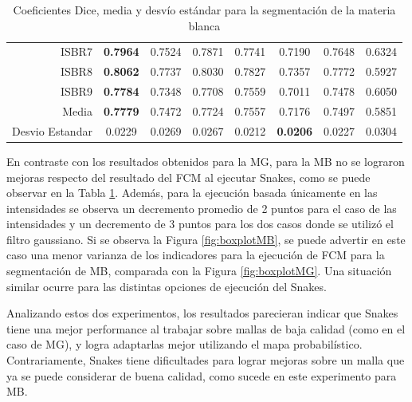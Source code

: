 \begin{table}[h]
{\begin{tabular}{r|ccc|cccc}
			ISBR7 & \textbf{0.7964} & 0.7524 & 0.7871 & 0.7741 & 0.7190 & 0.7648 & 0.6324 \\
			ISBR8 & \textbf{0.8062} & 0.7737 & 0.8030 & 0.7827 & 0.7357 & 0.7772 & 0.5927 \\
			ISBR9 & \textbf{0.7784} & 0.7348 & 0.7708 & 0.7559 & 0.7011 & 0.7478 & 0.6050 \\ \hline
			Media & \textbf{0.7779} & 0.7472 & 0.7724 & 0.7557 & 0.7176 & 0.7497 & 0.5851 \\ \hline
			Desvio Estandar & 0.0229 & 0.0269 & 0.0267 & 0.0212 & \textbf{0.0206} & 0.0227 & 0.0304 \\ \hline
		\end{tabular}
	}
	\caption{Coeficientes Dice, media y desvío estándar para la segmentación de la materia blanca
		}
	\label{table:resultados_blanca}
\end{table}

En contraste con los resultados obtenidos para la MG, para la MB no se lograron mejoras respecto del resultado del FCM al ejecutar Snakes, como se puede observar en la Tabla \ref{table:resultados_blanca}. Además, para la ejecución basada únicamente en las intensidades se observa un decremento promedio de 2 puntos para el caso de las intensidades y un decremento de 3 puntos para los dos casos donde se utilizó el filtro gaussiano. Si se observa la Figura \ref{fig:boxplotMB}, se puede advertir en este caso una menor varianza de los indicadores para la ejecución de FCM para la segmentación de MB, comparada con la Figura \ref{fig:boxplotMG}. Una situación similar ocurre para las distintas opciones de ejecución del Snakes.

Analizando estos dos experimentos, los resultados parecieran indicar que Snakes tiene una mejor performance al trabajar sobre mallas de baja calidad (como en el caso de MG), y logra adaptarlas mejor utilizando el mapa probabilístico. Contrariamente, Snakes tiene dificultades para lograr mejoras sobre un malla que ya se puede considerar de buena calidad, como sucede en este experimento para MB.

